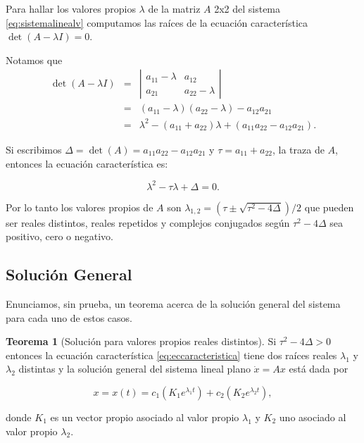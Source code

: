 \documentclass[11pt]{book}
\theoremstyle{definition}
\numberwithin{definition}{section}
\theoremstyle{theorem}
\newtheorem{theorem}{Teorema}
\numberwithin{theorem}{section}
\numberwithin{lemma}{section}
\numberwithin{corollary}{section}
\theoremstyle{plain}
\numberwithin{example}{section}
\begin{document}
Para hallar los valores propios $\lambda$ de la matriz $A$ 2x2 del sistema \ref{eq:sistemalinealv} computamos las raíces de la ecuación característica $\det(A - \lambda I) = 0$.

Notamos que
\begin{eqnarray*}
	\det(A - \lambda I) & = &  \left| \begin{array}{ll} a_{11} - \lambda & a_{12} \\ a_{21} & a_{22} - \lambda \end{array} \right| \\ 
	& = & (a_{11} - \lambda)(a_{22} - \lambda) - a_{12}a_{21} \\
	& = & \lambda^2 - (a_{11} + a_{22})\lambda + (a_{11}a_{22} - a_{12}a_{21}).
\end{eqnarray*}

Si escribimos $\Delta = \det(A) = a_{11}a_{22} - a_{12}a_{21}$ y $\tau = a_{11} + a_{22}$, la traza de $A$, entonces la ecuación característica es:

\begin{equation} \label{eq:eccaracteristica}
	\lambda^2 - \tau \lambda + \Delta = 0.
\end{equation}

Por lo tanto los valores propios de $A$ son $\lambda_{1,2} = (\tau \pm \sqrt{\tau^2 - 4\Delta}) / 2 $ que pueden ser reales distintos, reales repetidos y complejos conjugados según $\tau^2 - 4\Delta$ sea positivo, cero o negativo.

\subsection{Solución General} \label{subsec:soluciongeneral}

Enunciamos, sin prueba, un teorema acerca de la solución general del sistema para cada uno de estos casos.

\begin{theorem}[Solución para valores propios reales distintos]Si $\tau^2 - 4\Delta > 0$ entonces la ecuación característica \ref{eq:eccaracteristica} tiene dos raíces reales $\lambda_1$ y $\lambda_2$ distintas y la solución general del sistema lineal plano $\dot{x} = Ax$ está dada por

\begin{equation} \label{eq:solvlrspropiosdistintos}
x = x(t) = c_1(K_1 e^{\lambda_1 t}) + c_2(K_2 e^{\lambda_2 t}),
\end{equation}

donde $K_1$ es un vector propio asociado al valor propio $\lambda_1$ y $K_2$ uno asociado al valor propio $\lambda_2$.
\end{theorem}
\end{document}

